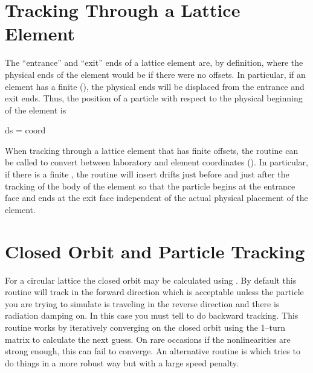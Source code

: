 {{{{{{%
\section{Tracking Through a Lattice Element}
\label{s:ele-track}

The ``entrance'' and ``exit'' ends of a lattice element are, by definition,
where the physical ends of the element would be if there were no
offsets. In particular, if an element has a finite 
(), the physical ends will be displaced from
the entrance and exit ends. Thus, the position  of a particle with
respect to the physical beginning of the element is
\begin{example}
  ds = coord%
\end{example}

When tracking through a lattice element that has finite offsets, the
 routine can be called to
convert between laboratory and element coordinates
(). In particular, if there is a finite
, the  routine will insert drifts
just before and just after the tracking of the body of the element so
that the particle begins at the entrance face and ends at the exit
face independent of the actual physical placement of the element.

\section{Closed Orbit and Particle Tracking}

For a circular lattice the closed orbit may be calculated using
. By default this routine will track in the
forward direction which is acceptable unless the particle you are
trying to simulate is traveling in the reverse direction and there is
radiation damping on. In this case you must tell
 to do backward tracking. This routine works by
iteratively converging on the closed orbit using the 1--turn matrix to
calculate the next guess. On rare occasions if the nonlinearities are
strong enough, this can fail to converge. An alternative routine is
 which tries to do things in a more
robust way but with a large speed penalty.

}}}}}}
